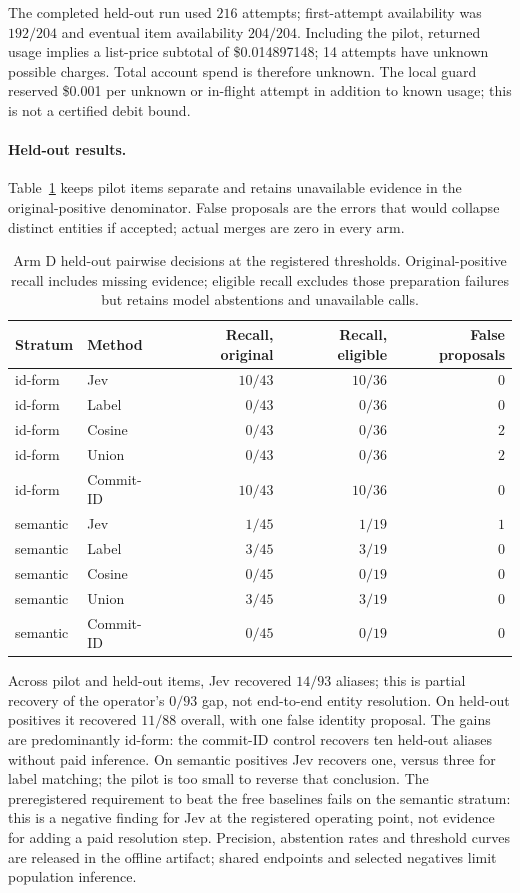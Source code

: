 The completed held-out run used $216$ attempts; first-attempt
availability was $192/204$ and eventual item
availability $204/204$. Including the pilot, returned
usage implies a list-price subtotal of \$0.014897148;
14 attempts have unknown possible charges. Total account spend
is therefore unknown. The local guard reserved \$0.001 per unknown or in-flight
attempt in addition to known usage; this is not a certified debit bound.

\paragraph{Held-out results.}
Table~\ref{tab:armD} keeps pilot items separate and retains unavailable evidence
in the original-positive denominator. False proposals are the errors that would
collapse distinct entities if accepted; actual merges are zero in every arm.
\begin{table}[ht]
\centering\small
\begin{tabular}{llrrr}
\hline
Stratum & Method & Recall, original & Recall, eligible & False proposals\\
\hline
id-form & Jev & $10/43$ & $10/36$ & $0$\\
id-form & Label & $0/43$ & $0/36$ & $0$\\
id-form & Cosine & $0/43$ & $0/36$ & $2$\\
id-form & Union & $0/43$ & $0/36$ & $2$\\
id-form & Commit-ID & $10/43$ & $10/36$ & $0$\\
semantic & Jev & $1/45$ & $1/19$ & $1$\\
semantic & Label & $3/45$ & $3/19$ & $0$\\
semantic & Cosine & $0/45$ & $0/19$ & $0$\\
semantic & Union & $3/45$ & $3/19$ & $0$\\
semantic & Commit-ID & $0/45$ & $0/19$ & $0$\\
\hline
\end{tabular}
\caption{Arm D held-out pairwise decisions at the registered thresholds.
Original-positive recall includes missing evidence; eligible recall excludes
those preparation failures but retains model abstentions and unavailable calls.}
\label{tab:armD}
\end{table}

Across pilot and held-out items, Jev recovered $14/93$ aliases; this is
partial recovery of the operator's $0/93$ gap, not end-to-end entity resolution.
On held-out positives it recovered $11/88$ overall, with
one false identity proposal. The gains are predominantly id-form: the
commit-ID control recovers ten held-out aliases without paid inference. On
semantic positives Jev recovers one, versus three for label matching; the
pilot is too small to reverse that conclusion. The preregistered requirement to beat the free baselines fails on the semantic
stratum: this is a negative finding for Jev at the registered operating point,
not evidence for adding a paid resolution step.
Precision, abstention rates and threshold curves are released in the offline
artifact; shared endpoints and selected negatives limit population inference.


